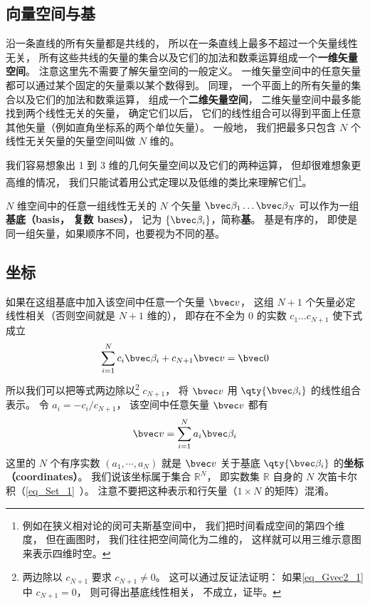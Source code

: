 \subsection{向量空间与基}
沿一条直线的所有矢量都是共线的， 所以在一条直线上最多不超过一个矢量线性无关， 所有这些共线的矢量的集合以及它们的加法和数乘运算组成一个\textbf{一维矢量空间}。 注意这里先不需要了解矢量空间的一般定义。 一维矢量空间中的任意矢量都可以通过某个固定的矢量乘以某个数得到。 同理， 一个平面上的所有矢量的集合以及它们的加法和数乘运算， 组成一个\textbf{二维矢量空间}， 二维矢量空间中最多能找到两个线性无关的矢量， 确定它们以后， 它们的线性组合可以得到平面上任意其他矢量（例如直角坐标系的两个单位矢量）。 一般地， 我们把最多只包含 $N$ 个线性无关矢量的矢量空间叫做 $N$ 维的。

我们容易想象出 1 到 3 维的几何矢量空间以及它们的两种运算， 但却很难想象更高维的情况， 我们只能试着用公式定理以及低维的类比来理解它们\footnote{例如在狭义相对论的闵可夫斯基空间中， 我们把时间看成空间的第四个维度， 但在画图时， 我们往往把空间简化为二维的， 这样就可以用三维示意图来表示四维时空。}。

$N$ 维空间中的任意一组线性无关的 $N$ 个矢量 $\bvec \beta_1\dots \bvec \beta_N$ 可以作为一组\textbf{基底（basis， 复数 bases）}， 记为 $\{\bvec \beta_i\}$，简称\textbf{基}。 基是有序的， 即使是同一组矢量，如果顺序不同，也要视为不同的基。

\subsection{坐标}
如果在这组基底中加入该空间中任意一个矢量 $\bvec v$， 这组 $N+1$ 个矢量必定线性相关（否则空间就是 $N+1$ 维的）， 即存在不全为 0 的实数 $c_1\dots c_{N+1}$ 使下式成立
\begin{equation}\label{eq_Gvec2_1}
\sum_{i=1}^{N} c_i \bvec \beta_i + c_{N+1} \bvec v = \bvec 0
\end{equation}
所以我们可以把等式两边除以\footnote{两边除以 $c_{N+1}$ 要求 $c_{N+1} \ne 0$。 这可以通过反证法证明： 如果\autoref{eq_Gvec2_1} 中 $c_{N+1} = 0$， 则可得出基底线性相关， 不成立，证毕。} $c_{N+1}$， 将 $\bvec v$ 用 $\qty{\bvec \beta_i}$ 的线性组合表示。 令 $a_i = -c_i/c_{N+1}$， 该空间中任意矢量 $\bvec v$ 都有
\begin{equation}\label{eq_Gvec2_5}
\bvec v = \sum_{i=1}^N a_i \bvec \beta_i
\end{equation}
这里的 $N$ 个有序实数 $(a_1, \cdots, a_N)$ 就是 $\bvec v$ 关于基底 $\qty{\bvec \beta_i}$ 的\textbf{坐标（coordinates）}。 我们说该坐标属于集合 $\mathbb R^N$， 即实数集 $\mathbb R$ 自身的 $N$ 次笛卡尔积（\autoref{eq_Set_1}~）。 注意不要把这种表示和行矢量（$1\times N$ 的矩阵）混淆。


